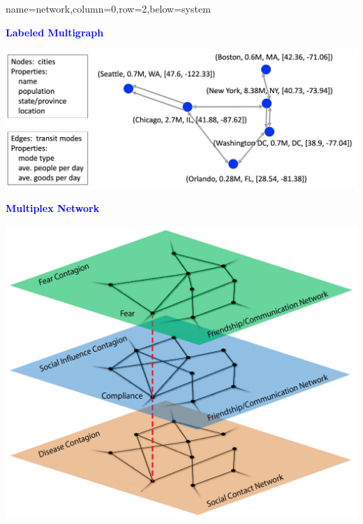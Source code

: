\documentclass[landscape,paperwidth=70in,paperheight=46in,fontscale=0.225]{baposter} %
\begin{document}
\begin{poster}
          {name=network,column=0,row=2,below=system}{         

\begin{minipage}{.5\textwidth}
\begin{center}
\textcolor{blue}{\textbf{Labeled Multigraph}}
\end{center}
\vspace{3mm}

\centering
\includegraphics[scale=0.25]{figures/single_net.png}
\end{minipage}
\hfill
 \begin{minipage}{.35\textwidth}   
 \textcolor{blue}{\textbf{Multiplex Network}}
 \vspace{3mm}
 
 \centering
\includegraphics[scale=0.35]{figures/multi_net.png}
\end{minipage}
}



\end{poster}
\end{document}
